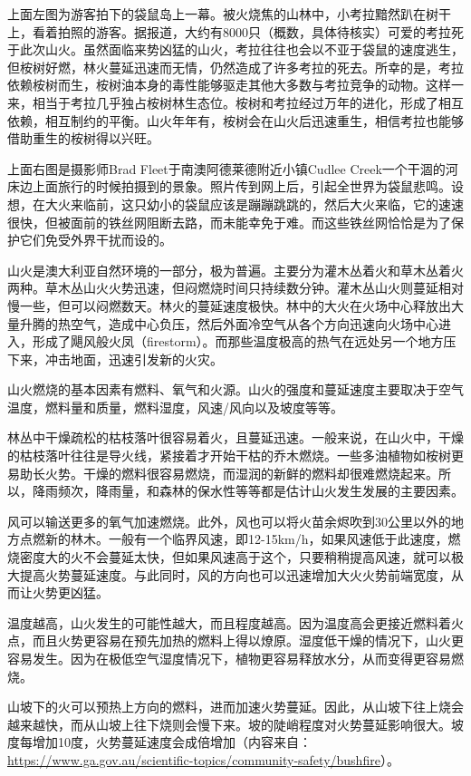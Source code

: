 \documentclass[
]{book}
\begin{document}
上面左图为游客拍下的袋鼠岛上一幕。被火烧焦的山林中，小考拉黯然趴在树干上，看着拍照的游客。据报道，大约有8000只（概数，具体待核实）可爱的考拉死于此次山火。虽然面临来势凶猛的山火，考拉往往也会以不亚于袋鼠的速度逃生，但桉树好燃，林火蔓延迅速而无情，仍然造成了许多考拉的死去。所幸的是，考拉依赖桉树而生，桉树油本身的毒性能够驱走其他大多数与考拉竞争的动物。这样一来，相当于考拉几乎独占桉树林生态位。桉树和考拉经过万年的进化，形成了相互依赖，相互制约的平衡。山火年年有，桉树会在山火后迅速重生，相信考拉也能够借助重生的桉树得以兴旺。

上面右图是摄影师Brad Fleet于南澳阿德莱德附近小镇Cudlee Creek一个干涸的河床边上面旅行的时候拍摄到的景象。照片传到网上后，引起全世界为袋鼠悲鸣。设想，在大火来临前，这只幼小的袋鼠应该是蹦蹦跳跳的，然后大火来临，它的速速很快，但被面前的铁丝网阻断去路，而未能幸免于难。而这些铁丝网恰恰是为了保护它们免受外界干扰而设的。

山火是澳大利亚自然环境的一部分，极为普遍。主要分为灌木丛着火和草木丛着火两种。草木丛山火火势迅速，但闷燃烧时间只持续数分钟。灌木丛山火则蔓延相对慢一些，但可以闷燃数天。林火的蔓延速度极快。林中的大火在火场中心释放出大量升腾的热空气，造成中心负压，然后外面冷空气从各个方向迅速向火场中心进入，形成了飓风般火凤（firestorm）。而那些温度极高的热气在远处另一个地方压下来，冲击地面，迅速引发新的火灾。

山火燃烧的基本因素有燃料、氧气和火源。山火的强度和蔓延速度主要取决于空气温度，燃料量和质量，燃料湿度，风速/风向以及坡度等等。

林丛中干燥疏松的枯枝落叶很容易着火，且蔓延迅速。一般来说，在山火中，干燥的枯枝落叶往往是导火线，紧接着才开始干枯的乔木燃烧。一些多油植物如桉树更易助长火势。干燥的燃料很容易燃烧，而湿润的新鲜的燃料却很难燃烧起来。所以，降雨频次，降雨量，和森林的保水性等等都是估计山火发生发展的主要因素。

风可以输送更多的氧气加速燃烧。此外，风也可以将火苗余烬吹到30公里以外的地方点燃新的林木。一般有一个临界风速，即12-15km/h，如果风速低于此速度，燃烧密度大的火不会蔓延太快，但如果风速高于这个，只要稍稍提高风速，就可以极大提高火势蔓延速度。与此同时，风的方向也可以迅速增加大火火势前端宽度，从而让火势更凶猛。

温度越高，山火发生的可能性越大，而且程度越高。因为温度高会更接近燃料着火点，而且火势更容易在预先加热的燃料上得以燎原。湿度低干燥的情况下，山火更容易发生。因为在极低空气湿度情况下，植物更容易释放水分，从而变得更容易燃烧。

山坡下的火可以预热上方向的燃料，进而加速火势蔓延。因此，从山坡下往上烧会越来越快，而从山坡上往下烧则会慢下来。坡的陡峭程度对火势蔓延影响很大。坡度每增加10度，火势蔓延速度会成倍增加（内容来自：\url{https://www.ga.gov.au/scientific-topics/community-safety/bushfire}）。
\end{document}
